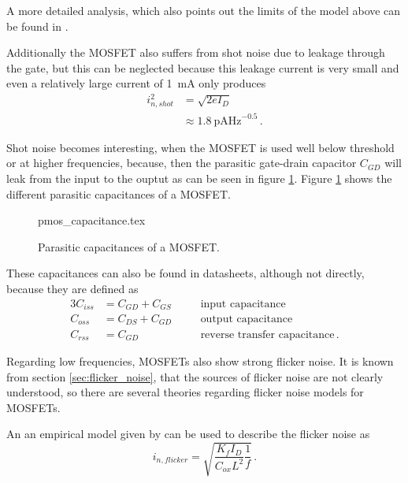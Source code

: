 \documentclass[12pt]{book}
\begin{document}
A more detailed analysis, which also points out the limits of the model above can be found in \cite{mosfet_thermal_noise_details}.

Additionally the MOSFET also suffers from shot noise due to leakage through the gate, but this can be neglected because this leakage current is very small and even a relatively large current of \qty{1}{\mA} only produces
\begin{align}
    i_{n,shot}^2 &= \sqrt{2 e I_D}\\
    &\approx \qty[power-half-as-sqrt, per-mode=symbol]{1.8}{\pA \Hz \tothe{-0.5}} \,.
\end{align}

Shot noise becomes interesting, when the MOSFET is used well below threshold or at higher frequencies, because, then the parasitic gate-drain capacitor $C_{GD}$ will leak from the input to the ouptut as can be seen in figure \ref{fig:mosfet_parasitic_capacitors}. Figure \ref{fig:mosfet_parasitic_capacitors} shows the different parasitic capacitances of a MOSFET.
\begin{figure}[hb]
    \centering
        {pmos_capacitance.tex}
    \caption{Parasitic capacitances of a MOSFET.}
    \label{fig:mosfet_parasitic_capacitors}
\end{figure}

These capacitances can also be found in datasheets, although not directly, because they are defined as
\begin{alignat}{3}
    C_{iss} &= C_{GD} + C_{GS} &\quad&\text{input capacitance}\\
    C_{oss} &= C_{DS} + C_{GD} &\quad&\text{output capacitance}\\
    C_{rss} &= C_{GD} &\quad&\text{reverse transfer capacitance} \,.
\end{alignat}

Regarding low frequencies, MOSFETs also show strong flicker noise. It is known from section \ref{sec:flicker_noise}, that the sources of flicker noise are not clearly understood, so there are several theories regarding flicker noise models for MOSFETs.

An an empirical model given by \cite{mosfet_noise_overview,mosfet_flicker_noise} can be used to describe the flicker noise as
\begin{equation}
    i_{n,flicker} = \sqrt{\frac{K_f I_D}{C_{ox} L^2} \frac{1}{f}}\,.
\end{equation}
\end{document}

